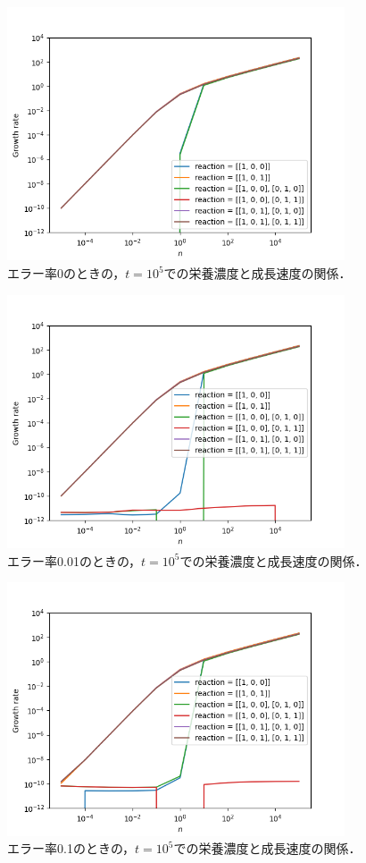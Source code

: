\documentclass[a4paper,11pt]{jsarticle}
\begin{document}
\begin{figure}[htbp]
  \centering
  \includegraphics[width=10cm]{waste_err0_ng_reac.png}
  \caption{エラー率0のときの，$t=10^5$での栄養濃度と成長速度の関係．}
  \label{fig:err0_ng_reac}
\end{figure}

\begin{figure}[htbp]
  \centering
  \includegraphics[width=10cm]{waste_err001_ng_reac.png}
  \caption{エラー率0.01のときの，$t=10^5$での栄養濃度と成長速度の関係．}
  \label{fig:err001_ng_reac}
\end{figure}

\begin{figure}[htbp]
  \centering
  \includegraphics[width=10cm]{waste_err01_ng_reac.png}
  \caption{エラー率0.1のときの，$t=10^5$での栄養濃度と成長速度の関係．}
  \label{fig:err01_ng_reac}
\end{figure}
\end{document}
